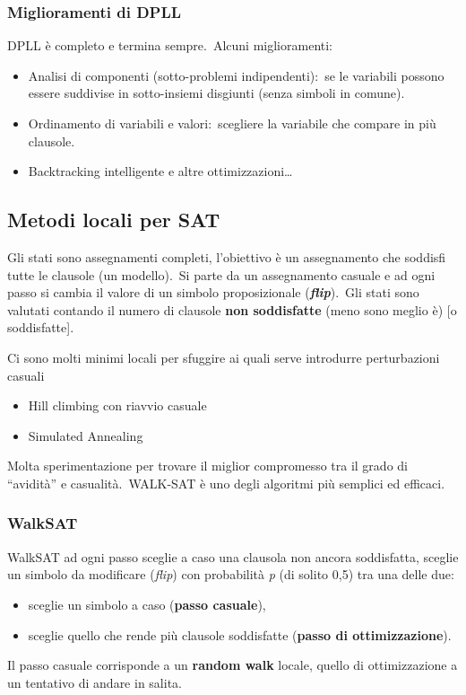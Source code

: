 \subsubsection{Miglioramenti di DPLL}

DPLL è completo e termina sempre.\
Alcuni miglioramenti:
\begin{itemize}
	\item Analisi di componenti (sotto-problemi indipendenti):\ se le variabili possono essere suddivise in sotto-insiemi disgiunti (senza simboli in comune).
	\item Ordinamento di variabili e valori:\ scegliere la variabile che compare in più clausole.
	\item Backtracking intelligente e altre ottimizzazioni\dots
\end{itemize}

\subsection{Metodi locali per SAT}

Gli stati sono assegnamenti completi, l'obiettivo è un assegnamento che soddisfi tutte le clausole (un modello).\
Si parte da un assegnamento casuale e ad ogni passo si cambia il valore di un simbolo proposizionale (\textbf{\textit{flip}}).\
Gli stati sono valutati contando il numero di clausole \textbf{non soddisfatte} (meno sono meglio è) [o soddisfatte].\

Ci sono molti minimi locali per sfuggire ai quali serve introdurre perturbazioni casuali
\begin{itemize}
	\item Hill climbing con riavvio casuale
	\item Simulated Annealing
\end{itemize}
Molta sperimentazione per trovare il miglior compromesso tra il grado di ``avidità'' e casualità.\
WALK-SAT è uno degli algoritmi più semplici ed efficaci.

\subsubsection{WalkSAT}

WalkSAT ad ogni passo sceglie a caso una clausola non ancora soddisfatta, sceglie un simbolo da modificare (\textit{flip}) con probabilità \textit{p} (di solito 0,5) tra una delle due:
\begin{itemize}
	\item sceglie un simbolo a caso (\textbf{passo casuale}),
	\item sceglie quello che rende più clausole soddisfatte (\textbf{passo di ottimizzazione}).
\end{itemize}
Il passo casuale corrisponde a un \textbf{random walk} locale, quello di ottimizzazione a un tentativo di andare in salita.

